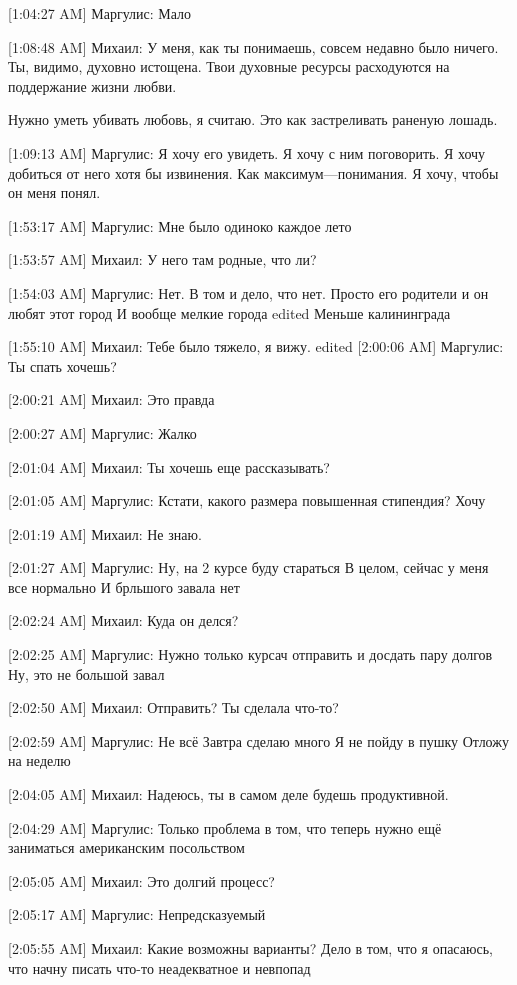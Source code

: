\documentclass{article}
\begin{document}
[1:04:27 AM] Маргулис:
Мало

[1:08:48 AM] Михаил:
У меня, как ты понимаешь, совсем недавно было ничего.  Ты, видимо, духовно истощена. Твои духовные ресурсы расходуются на поддержание жизни любви. 

Нужно уметь убивать любовь, я считаю. Это как застреливать раненую лошадь.

[1:09:13 AM] Маргулис:
Я хочу его увидеть.
 Я хочу с ним поговорить.
 Я хочу добиться от него хотя бы извинения.
 Как максимум—понимания. Я хочу, чтобы он меня понял.

[1:53:17 AM] Маргулис:
Мне было одиноко каждое лето

[1:53:57 AM] Михаил:
У него там родные, что ли?

[1:54:03 AM] Маргулис:
Нет.
 В том и дело, что нет.
 Просто его родители и он любят этот город
 И вообще мелкие города
edited 
Меньше калининграда

[1:55:10 AM] Михаил:
Тебе было тяжело, я вижу.
edited 
[2:00:06 AM] Маргулис:
Ты спать хочешь?

[2:00:21 AM] Михаил:
Это правда

[2:00:27 AM] Маргулис:
Жалко

[2:01:04 AM] Михаил:
Ты хочешь еще рассказывать?

[2:01:05 AM] Маргулис:
Кстати, какого размера повышенная стипендия?
 Хочу

[2:01:19 AM] Михаил:
Не знаю.

[2:01:27 AM] Маргулис:
Ну, на 2 курсе буду стараться
 В целом, сейчас у меня все нормально
 И брльшого завала нет

[2:02:24 AM] Михаил:
Куда он делся?

[2:02:25 AM] Маргулис:
Нужно только курсач отправить и досдать пару долгов
 Ну, это не большой завал

[2:02:50 AM] Михаил:
Отправить? Ты сделала что-то?

[2:02:59 AM] Маргулис:
Не всё
 Завтра сделаю много
 Я не пойду в пушку
 Отложу на неделю

[2:04:05 AM] Михаил:
Надеюсь, ты в самом деле будешь продуктивной.

[2:04:29 AM] Маргулис:
Только проблема в том, что теперь нужно ещё заниматься американским посольством

[2:05:05 AM] Михаил:
Это долгий процесс?

[2:05:17 AM] Маргулис:
Непредсказуемый

[2:05:55 AM] Михаил:
Какие возможны варианты?
 Дело в том, что я опасаюсь, что начну писать что-то неадекватное и невпопад
\end{document}
